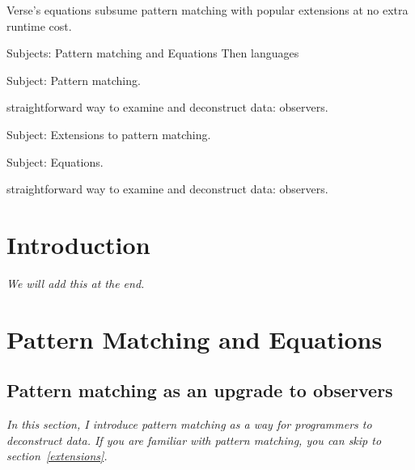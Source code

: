\documentclass[manuscript,screen,review, 12pt]{acmart}
\begin{document}
Verse's equations subsume pattern matching with popular extensions at no extra runtime cost. 


Subjects: Pattern matching and Equations 
Then languages 



Subject: Pattern matching. 


straightforward way to examine and deconstruct data: observers. 


Subject: Extensions to pattern matching. 

Subject: Equations. 

straightforward way to examine and deconstruct data: observers. 
















\section{Introduction}
\it{We will add this at the end.}



\section{Pattern Matching and Equations}
\label{pmandequations}
\subsection{Pattern matching as an upgrade to observers}
\label{pmoverobservers}

    
    

    \it{In this section, I introduce pattern matching as a way for programmers
    to deconstruct data. If you are familiar with pattern matching, you can skip
    to section~\ref{extensions}.}
    
\end{document}
